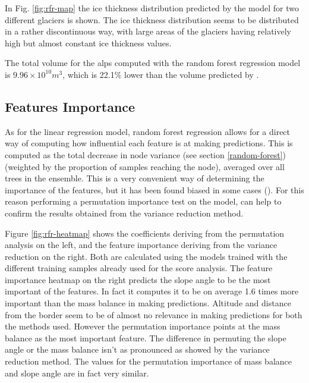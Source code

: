 In Fig. \ref{fig:rfr-map} the ice thickness distribution predicted by the model for two different glaciers is shown. The ice thickness distribution seems to be distributed in a rather discontinuous way, with large areas of the glaciers having relatively high but almost constant ice thickness values. 

The total volume for the alps computed with the random forest regression model is $9.96 \times 10^{10}m^3$, which is 22.1\% lower than the volume predicted by \citet{Farinotti2019}.

\subsection{Features Importance}\label{rfr-features}

As for the linear regression model, random forest regression allows for a direct way of computing how influential each feature is at making predictions. This is computed as the total decrease in node variance (see section \ref{random-forest}) (weighted by the proportion of samples reaching the node), averaged over all trees in the ensemble. This is a very convenient way of determining the importance of the features, but it has been found biased in some cases (\citet{RandomFBias2007}). For this reason performing a permutation importance test on the model, can help to confirm the results obtained from the variance reduction method. 

Figure \ref{fig:rfr-heatmap} shows the coefficients deriving from the permutation analysis on the left, and the feature importance deriving from the variance reduction on the right. Both are calculated using the models trained with the different training samples already used for the score analysis. The feature importance heatmap on the right predicts the slope angle to be the most important of the features. In fact it computes it to be on average 1.6 times more important than the mass balance in making predictions. Altitude and distance from the border seem to be of almost no relevance in making predictions for both the methods used. However the permutation importance points at the mass balance as the most important feature. The difference in permuting the slope angle or the mass balance isn't as pronounced as showed by the variance reduction method. The values for the permutation importance of mass balance and slope angle are in fact very similar.

